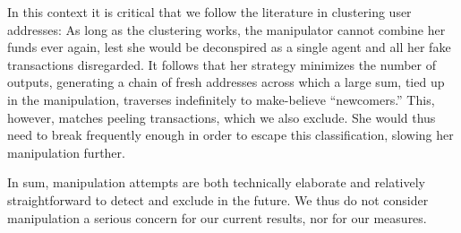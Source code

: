 In this context it is critical that we follow the literature in clustering
user addresses: As long as the clustering works, the manipulator cannot
combine her funds ever again, lest she would be deconspired as a single agent
and all her fake transactions disregarded.  It follows that her strategy
minimizes the number of outputs, generating a chain of fresh addresses across
which a large sum, tied up in the manipulation, traverses indefinitely to
make-believe ``newcomers.''  This, however, matches peeling transactions,
which we also exclude.  She would thus need to break frequently enough in
order to escape this classification, slowing her manipulation further.



In sum, manipulation attempts are both technically elaborate and relatively
straightforward to detect and exclude in the future. %
We thus do not consider manipulation a serious concern for our current
results, nor for our measures.

% 
%